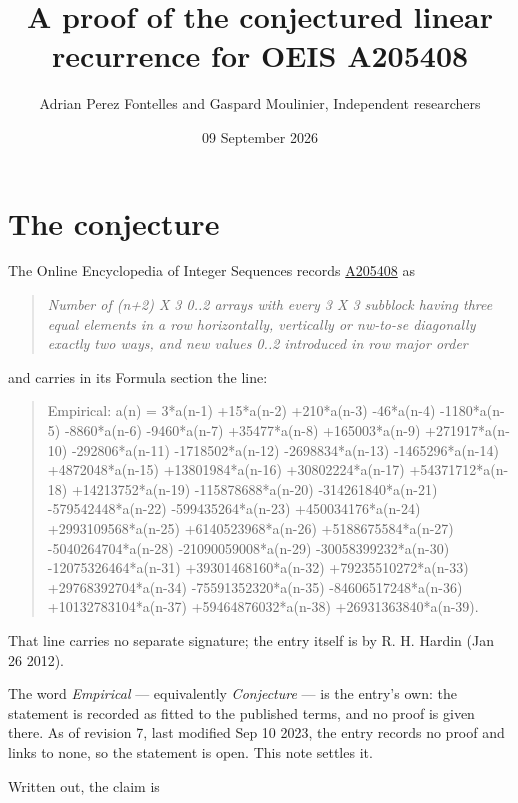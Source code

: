 \documentclass[11pt]{article}
\title{A proof of the conjectured linear recurrence for OEIS A205408}
\author{Adrian Perez Fontelles and Gaspard Moulinier, Independent researchers}
\date{09 September 2026}
\theoremstyle{definition}
\begin{document}
\maketitle
\section{The conjecture}

The Online Encyclopedia of Integer Sequences records \href{https://oeis.org/A205408}{A205408} as

\begin{quote}\itshape Number of (n+2) X 3 0..2 arrays with every 3 X 3 subblock having three equal elements in a row horizontally, vertically or nw-to-se diagonally exactly two ways, and new values 0..2 introduced in row major order\end{quote}

and carries in its Formula section the line:

\begin{quote}\ttfamily Empirical: a(n) = 3*a(n-1) +15*a(n-2) +210*a(n-3) -46*a(n-4) -1180*a(n-5) -8860*a(n-6) -9460*a(n-7) +35477*a(n-8) +165003*a(n-9) +271917*a(n-10) -292806*a(n-11) -1718502*a(n-12) -2698834*a(n-13) -1465296*a(n-14) +4872048*a(n-15) +13801984*a(n-16) +30802224*a(n-17) +54371712*a(n-18) +14213752*a(n-19) -115878688*a(n-20) -314261840*a(n-21) -579542448*a(n-22) -599435264*a(n-23) +450034176*a(n-24) +2993109568*a(n-25) +6140523968*a(n-26) +5188675584*a(n-27) -5040264704*a(n-28) -21090059008*a(n-29) -30058399232*a(n-30) -12075326464*a(n-31) +39301468160*a(n-32) +79235510272*a(n-33) +29768392704*a(n-34) -75591352320*a(n-35) -84606517248*a(n-36) +10132783104*a(n-37) +59464876032*a(n-38) +26931363840*a(n-39).\end{quote}

That line carries no separate signature; the entry itself is by R. H. Hardin (Jan 26 2012).

The word {\itshape Empirical} --- equivalently {\itshape Conjecture} --- is the entry's own: the statement is recorded as fitted to the published terms, and no proof is given there. As of revision 7, last modified Sep 10 2023, the entry records no proof and links to none, so the statement is open. This note settles it.

Written out, the claim is
\end{document}
